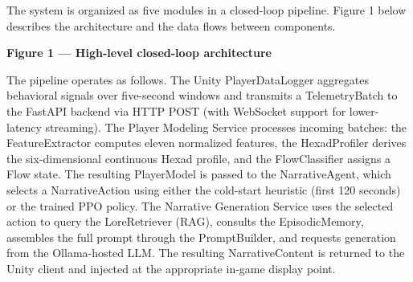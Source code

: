 The system is organized as five modules in a closed-loop pipeline.
Figure 1 below describes the architecture and the data flows between
components.

\begin{Shaded}
\begin{Highlighting}[]
\end{Highlighting}
\end{Shaded}

\textbf{Figure 1 --- High-level closed-loop architecture}

The pipeline operates as follows. The Unity PlayerDataLogger aggregates
behavioral signals over five-second windows and transmits a
TelemetryBatch to the FastAPI backend via HTTP POST (with WebSocket
support for lower-latency streaming). The Player Modeling Service
processes incoming batches: the FeatureExtractor computes eleven
normalized features, the HexadProfiler derives the six-dimensional
continuous Hexad profile, and the FlowClassifier assigns a Flow state.
The resulting PlayerModel is passed to the NarrativeAgent, which selects
a NarrativeAction using either the cold-start heuristic (first 120
seconds) or the trained PPO policy. The Narrative Generation Service
uses the selected action to query the LoreRetriever (RAG), consults the
EpisodicMemory, assembles the full prompt through the PromptBuilder, and
requests generation from the Ollama-hosted LLM. The resulting
NarrativeContent is returned to the Unity client and injected at the
appropriate in-game display point.

